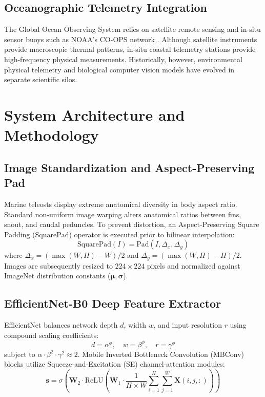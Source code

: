 \documentclass[conference]{IEEEtran}
\begin{document}
\subsection{Oceanographic Telemetry Integration}
The Global Ocean Observing System relies on satellite remote sensing and in-situ sensor buoys such as NOAA's CO-OPS network \cite{noaa2023}. Although satellite instruments provide macroscopic thermal patterns, in-situ coastal telemetry stations provide high-frequency physical measurements. Historically, however, environmental physical telemetry and biological computer vision models have evolved in separate scientific silos.

\section{System Architecture and Methodology}
\subsection{Image Standardization and Aspect-Preserving Pad}
Marine teleosts display extreme anatomical diversity in body aspect ratio. Standard non-uniform image warping alters anatomical ratios between fins, snout, and caudal peduncles. To prevent distortion, an Aspect-Preserving Square Padding ($\text{SquarePad}$) operator is executed prior to bilinear interpolation:
\begin{equation}
\text{SquarePad}(I) = \text{Pad}(I, \Delta_x, \Delta_y)
\end{equation}
where $\Delta_x = (\max(W, H) - W)/2$ and $\Delta_y = (\max(W, H) - H)/2$. Images are subsequently resized to $224 \times 224$ pixels and normalized against ImageNet distribution constants ($\boldsymbol{\mu}, \boldsymbol{\sigma}$).

\subsection{EfficientNet-B0 Deep Feature Extractor}
EfficientNet balances network depth $d$, width $w$, and input resolution $r$ using compound scaling coefficients:
\begin{equation}
d = \alpha^\phi, \quad w = \beta^\phi, \quad r = \gamma^\phi
\end{equation}
subject to $\alpha \cdot \beta^2 \cdot \gamma^2 \approx 2$. Mobile Inverted Bottleneck Convolution (MBConv) blocks utilize Squeeze-and-Excitation (SE) channel-attention modules:
\begin{equation}
\mathbf{s} = \sigma\left(\mathbf{W}_2 \cdot \text{ReLU}\left(\mathbf{W}_1 \cdot \frac{1}{H \times W} \sum_{i=1}^H \sum_{j=1}^W \mathbf{X}(i, j, :)\right)\right)
\end{equation}
\end{document}
